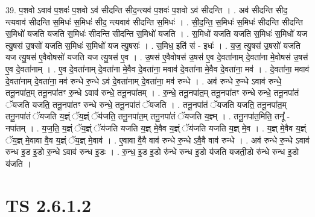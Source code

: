 \documentclass[17pt]{extarticle}
\begin{document}
39. प॒शवो ऽवाव॑ प॒शवः॑ प॒शवो ऽव॑ सीदन्ति सीद॒न्त्यव॑ प॒शवः॑ प॒शवो ऽव॑ सीदन्ति । . अव॑ सीदन्ति सीद॒ न्त्यवाव॑ सीदन्ति स॒मिधः॑ स॒मिधः॑ सीद॒ न्त्यवाव॑ सीदन्ति स॒मिधः॑ । . सी॒द॒न्ति॒ स॒मिधः॑ स॒मिधः॑ सीदन्ति सीदन्ति स॒मिधो॑ यजति यजति स॒मिधः॑ सीदन्ति सीदन्ति स॒मिधो॑ यजति । . स॒मिधो॑ यजति यजति स॒मिधः॑ स॒मिधो॑ यज त्यु॒षस॑ उ॒षसो॑ यजति स॒मिधः॑ स॒मिधो॑ यज त्यु॒षसः॑ । . स॒मिध॒ इति॑ सं - इधः॑ । . य॒ज॒ त्यु॒षस॑ उ॒षसो॑ यजति यज त्यु॒षस॑ ए॒वैवोषसो॑ यजति यज त्यु॒षस॑ ए॒व । . उ॒षस॑ ए॒वैवोषस॑ उ॒षस॑ ए॒व दे॒वता॑नाम् दे॒वता॑ना मे॒वोषस॑ उ॒षस॑ ए॒व दे॒वता॑नाम् । . ए॒व दे॒वता॑नाम् दे॒वता॑ना मे॒वैव दे॒वता॑ना॒ मवाव॑ दे॒वता॑ना मे॒वैव दे॒वता॑ना॒ मव॑ । . दे॒वता॑ना॒ मवाव॑ दे॒वता॑नाम् दे॒वता॑ना॒ मव॑ रुन्धे रु॒न्धे ऽव॑ दे॒वता॑नाम् दे॒वता॑ना॒ मव॑ रुन्धे । . अव॑ रुन्धे रु॒न्धे ऽवाव॑ रुन्धे॒ तनू॒नपा॑त॒म् तनू॒नपा॑तꣳ रु॒न्धे ऽवाव॑ रुन्धे॒ तनू॒नपा॑तम् । . रु॒न्धे॒ तनू॒नपा॑त॒म् तनू॒नपा॑तꣳ रुन्धे रुन्धे॒ तनू॒नपा॑तं ॅयजति यजति॒ तनू॒नपा॑तꣳ रुन्धे रुन्धे॒ तनू॒नपा॑तं ॅयजति । . तनू॒नपा॑तं ॅयजति यजति॒ तनू॒नपा॑त॒म् तनू॒नपा॑तं ॅयजति य॒ज्ञ्ं ॅय॒ज्ञ्ं ॅय॑जति॒ तनू॒नपा॑त॒म् तनू॒नपा॑तं ॅयजति य॒ज्ञ्म् । . तनू॒नपा॑त॒मिति॒ तनू᳚ - नपा॑तम् । . य॒ज॒ति॒ य॒ज्ञ्ं ॅय॒ज्ञ्ं ॅय॑जति यजति य॒ज्ञ् मे॒वैव य॒ज्ञ्ं ॅय॑जति यजति य॒ज्ञ् मे॒व । . य॒ज्ञ् मे॒वैव य॒ज्ञ्ं ॅय॒ज्ञ् मे॒वावा वै॒व य॒ज्ञ्ं ॅय॒ज्ञ् मे॒वाव॑ । . ए॒वावा वै॒वै वाव॑ रुन्धे रु॒न्धे ऽवै॒वै वाव॑ रुन्धे । . अव॑ रुन्धे रु॒न्धे ऽवाव॑ रुन्ध इ॒ड इ॒डो रु॒न्धे ऽवाव॑ रुन्ध इ॒डः । . रु॒न्ध॒ इ॒ड इ॒डो रु॑न्धे रुन्ध इ॒डो य॑जति यजती॒डो रु॑न्धे रुन्ध इ॒डो य॑जति । \newline
\pagebreak
{}

\section{ TS 2.6.1.2 }
\end{document}
